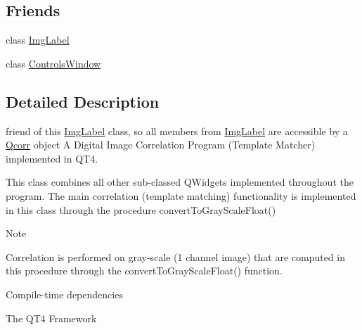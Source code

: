 \subsection*{Friends}
\begin{DoxyCompactItemize}
\item 
\hypertarget{classQcorr_a5b4b2caf4c596b601dd096785e4a32b9}{
class \hyperlink{classQcorr_a5b4b2caf4c596b601dd096785e4a32b9}{ImgLabel}}
\label{classQcorr_a5b4b2caf4c596b601dd096785e4a32b9}

\item 
\hypertarget{classQcorr_ace49e9a34b2d2df1e7683be4cacba1d8}{
class \hyperlink{classQcorr_ace49e9a34b2d2df1e7683be4cacba1d8}{ControlsWindow}}
\label{classQcorr_ace49e9a34b2d2df1e7683be4cacba1d8}

\end{DoxyCompactItemize}


\subsection{Detailed Description}
friend of this \hyperlink{classImgLabel}{ImgLabel} class, so all members from \hyperlink{classImgLabel}{ImgLabel} are accessible by a \hyperlink{classQcorr}{Qcorr} object A Digital Image Correlation Program (Template Matcher) implemented in QT4.

This class combines all other sub-\/classed QWidgets implemented throughout the program. The main correlation (template matching) functionality is implemented in this class through the procedure convertToGrayScaleFloat()

\begin{DoxyNote}{Note}

\end{DoxyNote}
Correlation is performed on gray-\/scale (1 channel image) that are computed in this procedure through the convertToGrayScaleFloat() function.

\begin{DoxyParagraph}{Compile-\/time dependencies}

\end{DoxyParagraph}

\begin{DoxyItemize}
\item The QT4 Framework
\end{DoxyItemize}

